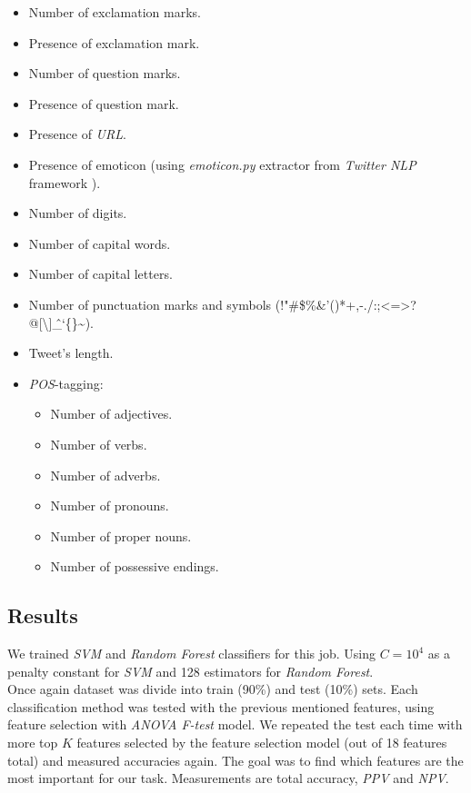 \documentclass[letterpaper,twocolumn,10pt]{article}
\begin{document}
\begin{itemize}[noitemsep, nolistsep]
	\item Number of exclamation marks.
	\item Presence of exclamation mark.
	\item Number of question marks.
	\item Presence of question mark.
	\item Presence of \textit{URL}.
	\item Presence of emoticon (using \textit{emoticon.py} extractor from \textit{Twitter NLP} framework \cite{twitter_nlp}).
	\item Number of digits.
	\item Number of capital words.
	\item Number of capital letters.
	\item Number of punctuation marks and symbols (!"\#\$\%\&'()*+,-./:;<=>?@[\textbackslash]\^\_`\{\}\textasciitilde).
	\item Tweet's length.
	\item \textit{POS}-tagging:
		\begin{itemize}[noitemsep, nolistsep]
			\item Number of adjectives.
			\item Number of verbs.
			\item Number of adverbs.
			\item Number of pronouns.
			\item Number of proper nouns.
			\item Number of possessive endings.
		\end{itemize}
\end{itemize}

\subsection{Results}
We trained \textit{SVM} and \textit{Random Forest} classifiers for this job. Using $ C=10^4 $ as a penalty constant for \textit{SVM} and 128 estimators for \textit{Random Forest}.\\
Once again dataset was divide into train (90\%) and test (10\%) sets. Each classification method was tested with the previous mentioned features, using feature selection with \textit{ANOVA F-test} model. We repeated the test each time with more top $ K $ features selected by the feature selection model (out of 18 features total) and measured accuracies again. The goal was to find which features are the most important for our task. Measurements are total accuracy, \textit{PPV} and \textit{NPV}.\\
\end{document}
